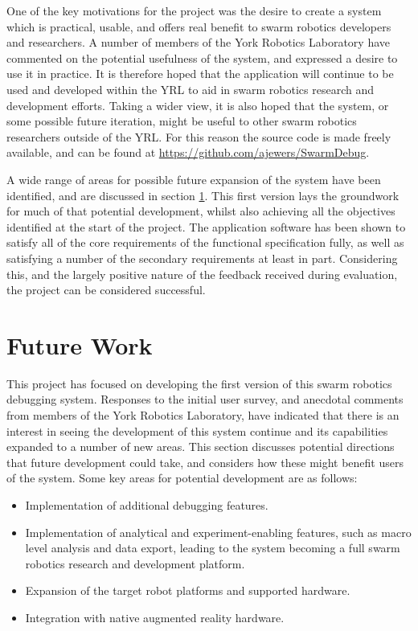 One of the key motivations for the project was the desire to create a system which is practical, usable, and offers real benefit to swarm robotics developers and researchers. A number of members of the York Robotics Laboratory have commented on the potential usefulness of the system, and expressed a desire to use it in practice. It is therefore hoped that the application will continue to be used and developed within the YRL to aid in swarm robotics research and development efforts. Taking a wider view, it is also hoped that the system, or some possible future iteration, might be useful to other swarm robotics researchers outside of the YRL. For this reason the source code is made freely available, and can be found at \url{https://github.com/ajewers/SwarmDebug}.

A wide range of areas for possible future expansion of the system have been identified, and are discussed in section \ref{FutureWork}. This first version lays the groundwork for much of that potential development, whilst also achieving all the objectives identified at the start of the project. The application software has been shown to satisfy all of the core requirements of the functional specification fully, as well as satisfying a number of the secondary requirements at least in part. Considering this, and the largely positive nature of the feedback received during evaluation, the project can be considered successful.


\section{Future Work} \label{FutureWork}

This project has focused on developing the first version of this swarm robotics debugging system. Responses to the initial user survey, and anecdotal comments from members of the York Robotics Laboratory, have indicated that there is an interest in seeing the development of this system continue and its capabilities expanded to a number of new areas. This section discusses potential directions that future development could take, and considers how these might benefit users of the system. Some key areas for potential development are as follows:

\begin{itemize}
 \item Implementation of additional debugging features.
 \item Implementation of analytical and experiment-enabling features, such as macro level analysis and data export, leading to the system becoming a full swarm robotics research and development platform.
 \item Expansion of the target robot platforms and supported hardware.
 \item Integration with native augmented reality hardware.
\end{itemize}

